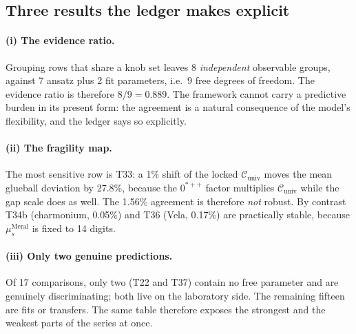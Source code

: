 \documentclass[12pt,a4paper]{article}
\begin{document}
\subsection{Three results the ledger makes explicit}
\paragraph{(i) The evidence ratio.} Grouping rows that share a knob set
leaves 8 \emph{independent} observable groups, against 7 ansatz plus 2 fit
parameters, i.e.\ 9 free degrees of freedom. The evidence ratio is
therefore $8/9 = 0.889$. The framework cannot carry a predictive burden in
its present form: the agreement is a natural consequence of the model's
flexibility, and the ledger says so explicitly.
\paragraph{(ii) The fragility map.} The most sensitive row is T33: a 1\% shift
of the locked $\mathcal{C}_{\mathrm{univ}}$ moves the mean glueball
deviation by 27.8\%, because the $0^{*++}$ factor multiplies
$\mathcal{C}_{\mathrm{univ}}$ while the gap scale does as well. The 1.56\%
agreement is therefore \emph{not} robust. By contrast T34b (charmonium,
0.05\%) and T36 (Vela, 0.17\%) are practically stable, because
$\mu_s^{\mathrm{Meral}}$ is fixed to 14 digits.
\paragraph{(iii) Only two genuine predictions.} Of 17 comparisons, only two
(T22 and T37) contain no free parameter and are genuinely discriminating;
both live on the laboratory side. The remaining fifteen are fits or
transfers. The same table therefore exposes the strongest and the weakest
parts of the series at once.
\end{document}
